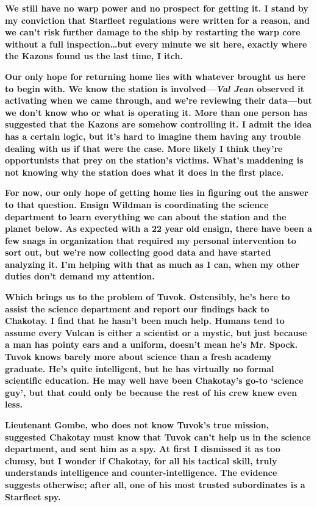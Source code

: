 \documentclass[twoside,letterpaper,12pt]{memoir}
\begin{document}
\textbf{We still have no warp power and no prospect for getting it. I stand by my conviction that Starfleet regulations were written for a reason, and we can't risk further damage to the ship by restarting the warp core without a full inspection\ldots but every minute we sit here, exactly where the Kazons found us the last time, I itch.}

\textbf{Our only hope for returning home lies with whatever brought us here to begin with. We know the station is involved---\textit{Val Jean }observed it activating when we came through, and we’re reviewing their data---but we don’t know who or what is operating it. More than one person has suggested that the Kazons are somehow controlling it. I admit the idea has a certain logic, but it’s hard to imagine them having any trouble dealing with us if that were the case. More likely I think they’re opportunists that prey on the station’s victims. What’s maddening is not knowing why the station does what it does in the first place.}

\textbf{For now, our only hope of getting home lies in figuring out the answer to that question. Ensign Wildman is coordinating the science department to learn everything we can about the station and the planet below. As expected with a 22 year old ensign, there have been a few snags in organization that required my personal intervention to sort out, but we're now collecting good data and have started analyzing it. I'm helping with that as much as I can, when my other duties don't demand my attention.}

\textbf{Which brings us to the problem of Tuvok. Ostensibly, he's here to assist the science department and report our findings back to Chakotay. I find that he hasn't been much help. Humans tend to assume every Vulcan is either a scientist or a mystic, but just because a man has pointy ears and a uniform, doesn't mean he's Mr. Spock. Tuvok knows barely more about science than a fresh academy graduate. He’s quite intelligent, but he has virtually no formal scientific education. He may well have been Chakotay's go-to `science guy', but that could only be because the rest of his crew knew even less. }

\textbf{Lieutenant Gombe, who does not know Tuvok's true mission, suggested Chakotay must know that Tuvok can't help us in the science department, and sent him as a spy. At first I dismissed it as too clumsy, but I wonder if Chakotay, for all his tactical skill, truly understands intelligence and counter-intelligence. The evidence suggests otherwise; after all, one of his most trusted subordinates is a Starfleet spy.}
\end{document}
